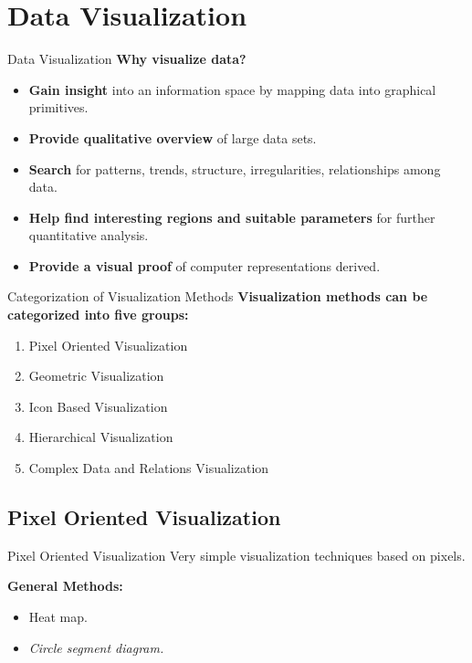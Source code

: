 \section{Data Visualization}

\begin{frame}{Data Visualization}
	\textbf{Why visualize data?}
	\begin{itemize}
		\item \textbf{Gain insight} into an information space by mapping data into graphical primitives.
		\item \textbf{Provide qualitative overview} of large data sets.
		\item \textbf{Search} for patterns, trends, structure, irregularities, relationships among data.
		\item \textbf{Help find interesting regions and suitable parameters} for further quantitative analysis.
		\item \textbf{Provide a visual proof} of computer representations derived.
	\end{itemize}
\end{frame}

\begin{frame}{Categorization of Visualization Methods}
	\textbf{Visualization methods can be categorized into five groups:}
	\begin{enumerate}
		\item Pixel Oriented Visualization
		\item Geometric Visualization
		\item Icon Based Visualization
		\item Hierarchical Visualization
		\item Complex Data and Relations Visualization
	\end{enumerate}
\end{frame}

\subsection{Pixel Oriented Visualization}

\begin{frame}{Pixel Oriented Visualization}
	Very simple visualization techniques based on pixels.

	\vspace*{0.2cm}

	\textbf{General Methods:}
	\begin{itemize}
		\item Heat map.
		\item \textit{Circle segment diagram.}
	\end{itemize}
\end{frame}

